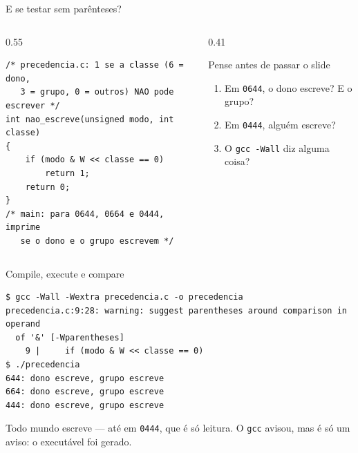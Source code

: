 \documentclass[aspectratio=169]{beamer}
\begin{document}
\begin{frame}[fragile]{E se testar sem parênteses?}
  \begin{columns}[c]
    \begin{column}{0.55\textwidth}
\begin{lstlisting}[style=codC]
/* precedencia.c: 1 se a classe (6 = dono,
   3 = grupo, 0 = outros) NAO pode escrever */
int nao_escreve(unsigned modo, int classe)
{
    if (modo & W << classe == 0)
        return 1;
    return 0;
}
/* main: para 0644, 0664 e 0444, imprime
   se o dono e o grupo escrevem */
\end{lstlisting}
    \end{column}
    \begin{column}{0.41\textwidth}
      \begin{block}{Pense antes de passar o slide}
        \small
        \begin{enumerate}
          \item Em \texttt{0644}, o dono escreve? E o grupo?
          \item Em \texttt{0444}, alguém escreve?
          \item O \texttt{gcc -Wall} diz alguma coisa?
        \end{enumerate}
      \end{block}
    \end{column}
  \end{columns}
\end{frame}

\begin{frame}[fragile]{Compile, execute e compare}
\begin{lstlisting}[style=shellStyle]
$ gcc -Wall -Wextra precedencia.c -o precedencia
precedencia.c:9:28: warning: suggest parentheses around comparison in operand
  of '&' [-Wparentheses]
    9 |     if (modo & W << classe == 0)
$ ./precedencia
644: dono escreve, grupo escreve
664: dono escreve, grupo escreve
444: dono escreve, grupo escreve
\end{lstlisting}
  \small Todo mundo escreve --- até em \texttt{0444}, que é só leitura.
  O \texttt{gcc} avisou, mas é só um aviso: o executável foi gerado.
\end{frame}
\end{document}
